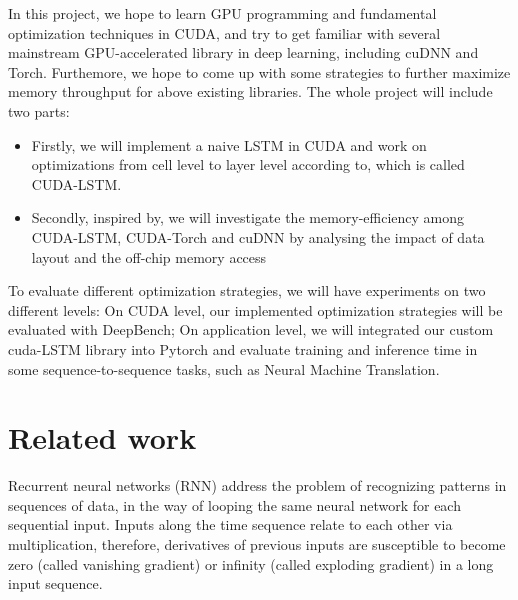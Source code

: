 \documentclass{article}
\begin{document}
In this project, we hope to learn GPU programming and fundamental optimization techniques in CUDA, and try to get familiar with several mainstream GPU-accelerated library in deep learning, including cuDNN and Torch. Furthemore, we hope to come up with some strategies to further maximize memory throughput for above existing libraries. The whole project will include two parts:

\begin{itemize}
  \item Firstly, we will implement a naive LSTM in CUDA and work on optimizations from cell level to layer level according to\cite{appleyard2016optimizing}, which is called CUDA-LSTM.
  \item Secondly, inspired by\cite{li2016optimizing}, we will investigate the memory-efficiency among CUDA-LSTM, CUDA-Torch\cite{PyTorch} and cuDNN by analysing the impact of data layout and the off-chip memory access

\end{itemize}


To evaluate different optimization strategies, we will have experiments on two different levels: On CUDA level, our implemented optimization strategies will be evaluated with DeepBench\cite{DeepBench}; On application level, we will integrated our custom cuda-LSTM library into Pytorch and evaluate training and inference time in some sequence-to-sequence tasks, such as Neural Machine Translation\cite{luong2015effective}.



\section{Related work}

Recurrent neural networks (RNN) address the problem of recognizing patterns in sequences of data, in the way of looping the same neural network for each sequential input. Inputs along the time sequence relate to each other via multiplication, therefore, derivatives of previous inputs are susceptible to become zero (called vanishing gradient) or infinity (called exploding gradient) in a long input sequence. 
\end{document}

